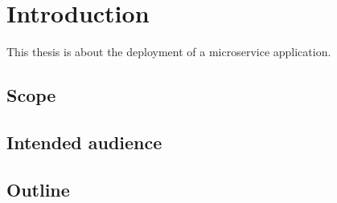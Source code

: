 
\chapter{Introduction} %

\label{chap:introd} %






This thesis is about the deployment of a microservice application.


\section{Scope}
\section{Intended audience}


\section{Outline}

